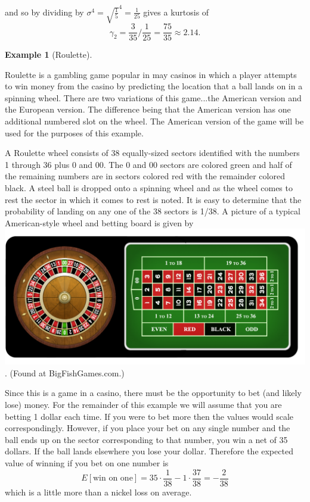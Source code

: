 \documentclass[10pt,]{book}
\theoremstyle{plain}
\theoremstyle{definition}
\theoremstyle{definition}
\newtheorem{example}[theorem]{Example}
\theoremstyle{definition}
\numberwithin{equation}{section}
\begin{document}
	and so by dividing by \(\sigma^4 = \sqrt{\frac{1}{5}}^4 = \frac{1}{25}\) gives a kurtosis of
	\begin{equation*}\gamma_2 = \frac{3}{35} / \frac{1}{25} = \frac{75}{35} \approx 2.14.\end{equation*}
\begin{example}[Roulette]\label{example-19}

Roulette is a gambling game popular in may casinos in which a player attempts to win money from the casino by predicting the location that a ball lands on in a spinning wheel.  There are two variations of this game...the American version and the European version. The difference being that the American version has one additional numbered slot on the wheel. The American version of the game will be used for the purposes of this example.
%
\par

A Roulette wheel consists of 38 equally-sized sectors identified with the numbers 1 through 36 plus 0 and 00. The 0 and 00 sectors are colored green and half of the remaining numbers are in sectors colored red with the remainder colored black.  A steel ball is dropped onto a spinning wheel and as the wheel comes to rest the sector in which it comes to rest is noted.  It is easy to determine that the probability of landing on any one of the 38 sectors is 1/38. A picture of a typical American-style wheel and betting board is given by
\includegraphics[width=1\linewidth]{images/6-1-American-Roulette-1024x463.png}
. (Found at BigFishGames.com.)
%
\par

Since this is a game in a casino, there must be the opportunity to bet (and likely lose) money. For the remainder of this example we will assume that you are betting 1 dollar each time. If you were to bet more then the values would scale correspondingly. However, if you place your bet on any single number and the ball ends up on the sector corresponding to that number, you win a net of 35 dollars.  If the ball lands elsewhere you lose your dollar. Therefore the expected value of winning if you bet on one number is
\begin{equation*}E[\text{win on one}] = 35 \cdot \frac{1}{38} - 1 \cdot \frac{37}{38} = - \frac{2}{38}\end{equation*}
which is a little more than a nickel loss on average.
%
\par


\end{example}
\end{document}
